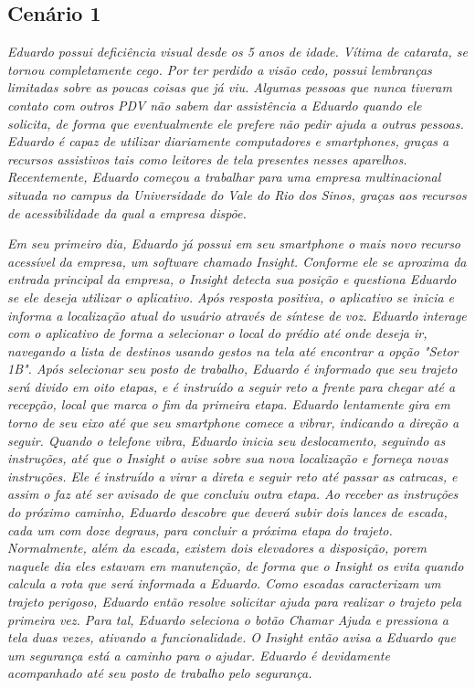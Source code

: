 \documentclass[twoside,english,brazilian]{UNISINOSartigo}
\begin{document}
\subsection{Cenário 1}
\textit{Eduardo possui deficiência visual desde os 5 anos de idade. Vítima de catarata, se tornou completamente cego. Por ter perdido a visão cedo, possui lembranças limitadas sobre as poucas coisas que já viu. Algumas pessoas que nunca tiveram contato com outros PDV não sabem dar assistência a Eduardo quando ele solicita, de forma que eventualmente ele prefere não pedir ajuda a outras pessoas. Eduardo é capaz de utilizar diariamente computadores e smartphones, graças a recursos assistivos tais como leitores de tela presentes nesses aparelhos. Recentemente, Eduardo começou a trabalhar para uma empresa multinacional situada no campus da Universidade do Vale do Rio dos Sinos, graças aos recursos de acessibilidade da qual a empresa dispõe.}

\textit{Em seu primeiro dia, Eduardo já possui em seu smartphone o mais novo recurso acessível da empresa, um software chamado Insight. Conforme ele se aproxima da entrada principal da empresa, o Insight detecta sua posição e questiona Eduardo se ele deseja utilizar o aplicativo. Após resposta positiva, o aplicativo se inicia e informa a localização atual do usuário através de síntese de voz. Eduardo interage com o aplicativo de forma a selecionar o local do prédio até onde deseja ir, navegando a lista de destinos usando gestos na tela até encontrar a opção "Setor 1B". Após selecionar seu posto de trabalho, Eduardo é informado que seu trajeto será divido em oito etapas, e é instruído a seguir reto a frente para chegar até a recepção, local que marca o fim da primeira etapa. Eduardo lentamente gira em torno de seu eixo até que seu smartphone comece a vibrar, indicando a direção a seguir. Quando o telefone vibra, Eduardo inicia seu deslocamento, seguindo as instruções, até que o Insight o avise sobre sua nova localização e forneça novas instruções. Ele é instruído a virar a direta e seguir reto até passar as catracas, e assim o faz até ser avisado de que concluiu outra etapa. Ao receber as instruções do próximo caminho, Eduardo descobre que deverá subir dois lances de escada, cada um com doze degraus, para concluir a próxima etapa do trajeto. Normalmente, além da escada, existem dois elevadores a disposição, porem naquele dia eles estavam em manutenção, de forma que o Insight os evita quando calcula a rota que será informada a Eduardo. Como escadas caracterizam um trajeto perigoso, Eduardo então resolve solicitar ajuda para realizar o trajeto pela primeira vez. Para tal, Eduardo seleciona o botão Chamar Ajuda e pressiona a tela duas vezes, ativando a funcionalidade. O Insight então avisa a Eduardo que um segurança está a caminho para o ajudar. Eduardo é devidamente acompanhado até seu posto de trabalho pelo segurança.}
\end{document}
